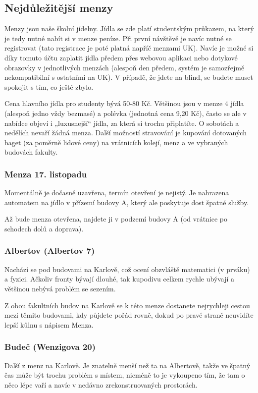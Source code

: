 \subsection{Nejdůležitější menzy}
Menzy jsou naše školní jídelny. Jídla se zde platí studentským průkazem, na
který je tedy nutné nabít si v menze peníze. Při první návštěvě je navíc nutné
se registrovat (tato registrace je poté platná napříč menzami UK). Navíc je
možné si díky tomuto účtu zaplatit jídla předem přes webovou aplikaci nebo
dotykové obrazovky v jednotlivých menzách (alespoň den předem, systém je
samozřejmě nekompatibilní s ostatními na UK). V případě, že jdete na blind, se
budete muset spokojit s tím, co ještě zbylo.

Cena hlavního jídla pro studenty bývá 50-80 Kč. Většinou jsou v menze 4 jídla
(alespoň jedno vždy bezmasé) a polévka (jednotná cena 9,20 Kč), často se ale v
nabídce objeví i „luxusnejší“ jídla, za která si trochu připlatíte. O sobotách a
nedělích nevaří žádná menza. Další možností stravování je kupování dotovaných
baget (za poměrně lidové ceny) na vrátnicích kolejí, menz a ve vybraných
budovách fakulty.


\subsubsection{Menza 17. listopadu}
Momentálně je dočasně uzavřena, termín otevření je nejistý. Je nahrazena automatem na jídlo v přízemí budovy A, který ale poskytuje dost špatné služby. 

Až bude menza otevřena, najdete ji v podzemí budovy A (od vrátnice po schodech
dolů a doprava).


\subsubsection{Albertov (Albertov 7)}
Nachází se pod budovami na Karlově, což ocení obzvláště matematici (v prváku) a
fyzici. Ačkoliv fronty bývají dlouhé, tak kupodivu celkem rychle ubývají a
většinou nebývá problém se sezením.

Z obou fakultních budov na Karlově se k této menze dostanete nejrychleji cestou
mezi těmito budovami, kdy půjdete pořád rovně, dokud po pravé straně neuvidíte
lepší kůlnu s nápisem Menza.


\subsubsection{Budeč (Wenzigova 20)}
Další z menz na Karlově. Je znatelně menší než ta na Albertově, takže ve špatný
čas může být trochu problém s místem, nicméně to je vykoupeno tím, že tam o něco
lépe vaří a navíc v nedávno zrekonstruovaných prostorách.

